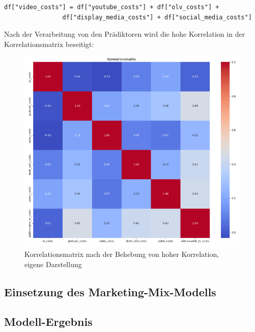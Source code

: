 \begin{lstlisting}
df["video_costs"] = df["youtube_costs"] + df["olv_costs"] + 
                df["display_media_costs"] + df["social_media_costs"]
\end{lstlisting}
Nach der Verarbeitung von den Prädiktoren wird die hohe Korrelation in der Korrelationsmatrix beseitigt:
\begin{figure}
    \centering
    \includegraphics[width=1\linewidth]{images/korrelationafter.png}
    \caption{Korrelationsmatrix nach der Behebung von hoher Korrelation, eigene Darstellung}
    \label{fig:korrelationsmatrix-danach}
\end{figure}
\subsection{Einsetzung des Marketing-Mix-Modells}
\subsection{Modell-Ergebnis}
